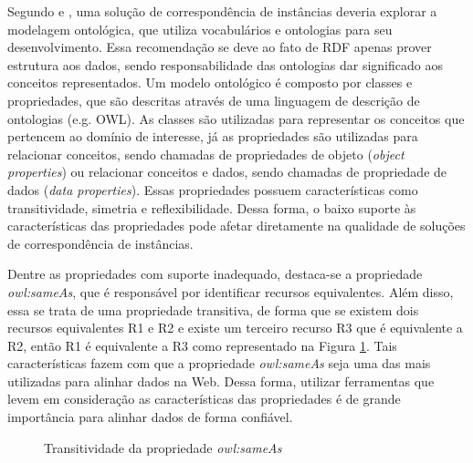 Segundo \cite{homoceanu2014putting} e \cite{ferrara2008towards}, uma solução de correspondência de instâncias deveria explorar a modelagem ontológica, que utiliza vocabulários e ontologias para seu desenvolvimento. Essa recomendação se deve ao fato de RDF apenas prover estrutura aos dados, sendo responsabilidade das ontologias dar significado aos conceitos representados. Um modelo ontológico é composto por classes e propriedades, que são descritas através de uma linguagem de descrição de ontologias (e.g. OWL). As classes são utilizadas para representar os conceitos que pertencem ao domínio de interesse, já as propriedades são utilizadas para relacionar conceitos, sendo chamadas de propriedades de objeto (\textit{object properties}) ou relacionar conceitos e dados, sendo chamadas de propriedade de dados (\textit{data properties}). Essas propriedades possuem características como transitividade, simetria e reflexibilidade. Dessa forma, o baixo suporte às características das propriedades pode afetar diretamente na qualidade de soluções de correspondência de instâncias. 
        
Dentre as propriedades com suporte inadequado,  destaca-se a propriedade \textit{owl:sameAs}, que é responsável por identificar recursos equivalentes. Além disso, essa se trata de uma propriedade transitiva, de forma que se existem dois recursos equivalentes R1 e R2 e existe um terceiro recurso R3 que é equivalente a R2, então R1 é equivalente a R3 como representado na Figura \ref{sameAsSample}. Tais características fazem com que a propriedade \textit{owl:sameAs} seja uma das  mais utilizadas para alinhar dados na Web. Dessa forma, utilizar ferramentas que levem em consideração as características das propriedades é de grande importância para alinhar dados de forma confiável.


\begin{figure}[h]
	\centering
		\caption{Transitividade da propriedade \textit{owl:sameAs}}
		\label{sameAsSample}
\end{figure}


